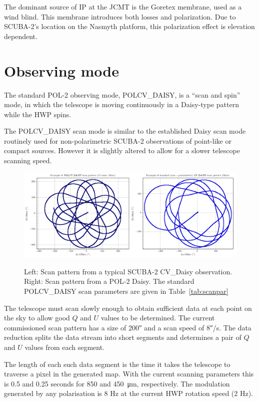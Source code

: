 The dominant source of IP at the JCMT is the Goretex membrane, used as a wind blind.
This membrane introduces both losses and polarization. Due to SCUBA-2's location
on the Nasmyth platform, this polarization effect is elevation dependent.


\section{Observing mode}
\label{sec:mmodes}

The standard POL-2 observing mode, POLCV\_DAISY, is a “scan and spin” mode,
in which the telescope is moving continuously in a Daisy-type pattern while the
HWP spins.

The POLCV\_DAISY scan mode is similar to the established Daisy scan mode
routinely used for non-polarimetric SCUBA-2 observations of point-like or compact
sources. However it is slightly altered to allow for a slower telescope scanning
speed.


\begin{figure}[t!]
\begin{center}
\includegraphics[width=0.9\linewidth]{scan_pattern_daisy_comparison.png}
\label{fig:scancompsrison}
\caption [Scan Pattern Comparison]{Left: Scan pattern from a typical SCUBA-2 CV\_Daisy
observation. Right: Scan pattern from a POL-2 Daisy. The standard POLCV\_DAISY scan
parameters are given in Table~\ref{tab:scanpar}
  \small
}
\end{center}
\end{figure}




The telescope must scan slowly enough to obtain sufficient data at each
point on the sky to allow good $Q$ and $U$ values to be determined. The current
commissioned scan pattern has a size of 200\si{\arcsecond} and a scan speed of
8\si{\arcsecond}/s. The data reduction splits the data stream into short
segments and determines a pair of $Q$ and $U$ values from each segment.

The length of each such data segment is the time it takes the telescope to traverse
a pixel in the generated map. With the current scanning parameters this is 0.5 and
0.25 seconds for 850 and \SI{450}{\micro\metre}, respectively. The modulation
generated by any polarisation is 8 Hz at the current HWP rotation speed
(2 Hz).

